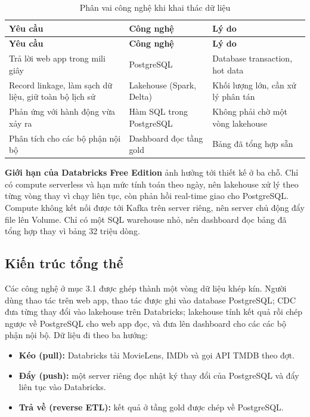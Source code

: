 \documentclass[a4paper,11pt]{article}
\newlength{\reporttablewidth}
\begin{document}
\begingroup
\small
{}
\setlength{\tabcolsep}{4pt}
\renewcommand{\arraystretch}{1.18}
\setlength{\reporttablewidth}{\dimexpr\linewidth-4\tabcolsep\relax}
\begin{longtable}{@{}L{0.32\reporttablewidth} L{0.24\reporttablewidth} L{0.44\reporttablewidth}@{}}
\caption[Mục đích các công nghệ được sử dụng (mục 3.1)]{Phân vai công nghệ khi khai thác dữ liệu}\label{tab:07} \\
\toprule
\textbf{Yêu cầu} & \textbf{Công nghệ} & \textbf{Lý do} \\
\midrule
\endfirsthead
\toprule
\textbf{Yêu cầu} & \textbf{Công nghệ} & \textbf{Lý do} \\
\midrule
\endhead
\midrule
\endfoot
\bottomrule
\endlastfoot
Trả lời web app trong mili giây & PostgreSQL & Database transaction, hot data\\
Record linkage, làm sạch dữ liệu, giữ toàn bộ lịch sử & Lakehouse (Spark, Delta) & Khối lượng lớn, cần xử lý phân tán \\
Phản ứng với hành động vừa xảy ra & Hàm SQL trong PostgreSQL & Không phải chờ một vòng lakehouse \\
Phân tích cho các bộ phận nội bộ & Dashboard đọc tầng gold & Bảng đã tổng hợp sẵn \\
\end{longtable}
\endgroup

\textbf{Giới hạn của Databricks Free Edition} ảnh hưởng tới thiết kế ở ba chỗ. Chỉ có compute serverless và hạn mức tính toán theo ngày, nên lakehouse xử lý theo từng vòng thay vì chạy liên tục, còn phản hồi real-time giao cho PostgreSQL. Compute không kết nối được tới Kafka trên server riêng, nên server chủ động đẩy file lên Volume. Chỉ có một SQL warehouse nhỏ, nên dashboard đọc bảng đã tổng hợp thay vì bảng 32 triệu dòng.

\subsection{Kiến trúc tổng thể}\label{sec:3.2}

Các công nghệ ở mục 3.1 được ghép thành một vòng dữ liệu khép kín. Người dùng thao tác trên web app, thao tác được ghi vào database PostgreSQL; CDC đưa từng thay đổi vào lakehouse trên Databricks; lakehouse tính kết quả rồi chép ngược về PostgreSQL cho web app đọc, và đưa lên dashboard cho các các bộ phận nội bộ. Dữ liệu đi theo ba hướng:

\begin{itemize}
  \item \textbf{Kéo (pull):} Databricks tải MovieLens, IMDb và gọi API TMDB theo đợt.
  \item \textbf{Đẩy (push):} một server riêng đọc nhật ký thay đổi của PostgreSQL và đẩy liên tục vào Databricks.
  \item \textbf{Trả về (reverse ETL):} kết quả ở tầng gold được chép về PostgreSQL.
\end{itemize}
\end{document}
